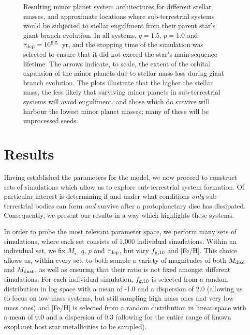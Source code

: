 \documentclass[useAMS,usenatbib]{mn2e}
\begin{document}
\begin{figure}
{}
\caption{
Resulting minor planet system architectures for different stellar masses, and approximate locations where sub-terrestrial systems would be subjected to stellar engulfment from their parent star's giant branch evolution. In all systems, $q=1.5$, $p=1.0$ and $\tau_{\rm dep}=10^{6.5}$~yr, and the stopping time of the simulation was selected to ensure that it did not exceed the star's main-sequence lifetime. The arrows indicate, to scale, the extent of the orbital expansion of the minor planets due to stellar mass loss during giant branch evolution. The plots illustrate that the higher the stellar mass, the less likely that surviving minor planets in sub-terrestrial systems will avoid engulfment, and those which do survive will harbour the lowest minor planet masses; many of these will be unprocessed seeds.
}
\label{FigPostMS}
\end{figure}




\section{Results}

Having established the parameters for the model, we now proceed to construct sets of simulations which allow us to explore sub-terrestrial system formation. Of particular interest is determining if and under what conditions {\it only} sub-terrestrial bodies can form {\it and} survive after a protoplanetary disc has dissipated. Consequently, we present our results in a way which highlights these systems.

In order to probe the most relevant parameter space, we perform many sets of simulations, where each set consists of 1,000 individual simulations. Within an individual set, we fix $M_{\star}$, $q$, $p$ and $\tau_{\rm dep}$, but vary $f_{\rm g,10}$ and [Fe/H]. This choice allows us, within every set, to both sample a variety of magnitudes of both $M_{\rm disc}$ and $M_{\rm dust}$, as well as ensuring that their ratio is not fixed amongst different simulations. For each individual simulation, $f_{\rm g,10}$ is selected from a random distribution in log space with a mean of -1.0 and a dispersion of 2.0 (allowing us to focus on low-mass systems, but still sampling high mass ones and very low mass ones) and [Fe/H] is selected from a random distribution in linear space with a mean of 0.0 and a dispersion of 0.3 (allowing for the entire range of known exoplanet host star metallicities to be sampled).
\end{document}
